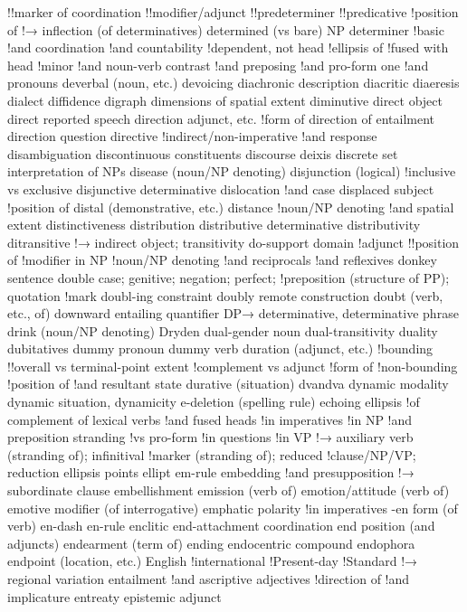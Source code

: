 !!marker of coordination
!!modifier/adjunct
!!predeterminer
!!predicative
!position of
!→ inflection (of determinatives)
determined (vs bare) NP
determiner
!basic
!and coordination
!and countability
!dependent, not head
!ellipsis of
!fused with head
!minor
!and noun-verb contrast
!and preposing
!and pro-form one
!and pronouns
deverbal (noun, etc.)
devoicing
diachronic description
diacritic
diaeresis
dialect
diffidence
digraph
dimensions of spatial extent
diminutive
direct object
direct reported speech
direction adjunct, etc.
!form of
direction of entailment
direction question
directive
!indirect/non-imperative
!and response
disambiguation
discontinuous constituents
discourse deixis
discrete set interpretation of NPs
disease (noun/NP denoting)
disjunction (logical)
!inclusive vs exclusive
disjunctive determinative
dislocation
!and case
displaced subject
!position of
distal (demonstrative, etc.)
distance
!noun/NP denoting
!and spatial extent
distinctiveness
distribution
distributive determinative
distributivity
ditransitive
!→ indirect object; transitivity
do-support
domain
!adjunct
!!position of
!modifier in NP
!noun/NP denoting
!and reciprocals
!and reflexives
donkey sentence
double case; genitive; negation; perfect;
!preposition (structure of PP); quotation
!mark
doubl-ing constraint
doubly remote construction
doubt (verb, etc., of)
downward entailing quantifier
DP→ determinative, determinative phrase
drink (noun/NP denoting)
Dryden
dual-gender noun
dual-transitivity
duality
dubitatives
dummy pronoun
dummy verb
duration (adjunct, etc.)
!bounding
!!overall vs terminal-point extent
!complement vs adjunct
!form of
!non-bounding
!position of
!and resultant state
durative (situation)
dvandva
dynamic modality
dynamic situation, dynamicity
e-deletion (spelling rule)
echoing
ellipsis
!of complement of lexical verbs
!and fused heads
!in imperatives
!in NP
!and preposition stranding
!vs pro-form
!in questions
!in VP
!→ auxiliary verb (stranding of); infinitival
!marker (stranding of); reduced
!clause/NP/VP; reduction
ellipsis points
ellipt
em-rule
embedding
!and presupposition
!→ subordinate clause
embellishment
emission (verb of)
emotion/attitude (verb of)
emotive modifier (of interrogative)
emphatic polarity
!in imperatives
-en form (of verb)
en-dash
en-rule
enclitic
end-attachment coordination
end position (and adjuncts)
endearment (term of)
ending
endocentric compound
endophora
endpoint (location, etc.)
English
!international
!Present-day
!Standard
!→ regional variation
entailment
!and ascriptive adjectives
!direction of
!and implicature
entreaty
epistemic adjunct
